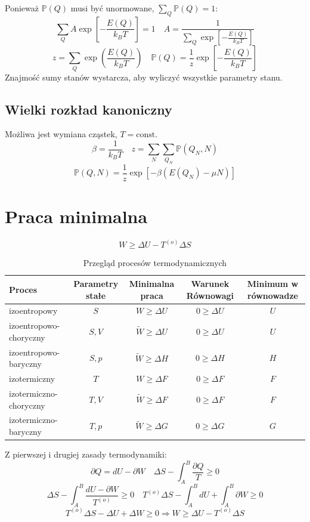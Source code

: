\documentclass{../notatki}
\begin{document}
Ponieważ $\mathbb{P}(Q)$ musi być unormowane, $\sum_{Q} \mathbb{P}(Q) = 1$:
$$
\sum_Q A\exp\left[-\frac{E(Q)}{k_BT}\right] = 1 \quad A =
\frac{1}{\sum_Q \exp\left[-\frac{E(Q)}{k_BT}\right]}
$$
$$
z = \sum_Q \exp \left(\frac{E(Q)}{k_BT}\right) \quad \mathbb{P}(Q) =
\frac{1}{z} \exp \left[-\frac{E(Q)}{k_BT}\right]
$$
Znajmość sumy stanów wystarcza, aby wyliczyć wszystkie parametry stanu.

\subsection{Wielki rozkład kanoniczny}

Możliwa jest wymiana cząstek, $T = \textrm{const}$.
$$
\beta = \frac{1}{k_BT} \quad z = \sum_N \sum_{Q_N} \mathbb{P}(Q_N, N)
$$
$$
\mathbb{P}(Q, N) = \frac{1}{z} \exp \left[-\beta(E(Q_N) - \mu N)\right]
$$

\section{Praca minimalna}

$$
W \geq \Delta U - T^{(o)} \Delta S
$$

\begin{table}[h]
  \centering
  \begin{tabular}{l|c|c|c|c}
    \textbf{Proces} & Parametry stałe & Minimalna praca & Warunek
    Równowagi & Minimum w równowadze \\
    \hline
    izoentropowy & $S$ & $W \geq \Delta U$ & $0 \geq \Delta U$ & $U$ \\ \hline
    izoentropowo-choryczny & $S, V$ & $\tilde{W} \geq \Delta U$ & $0
    \geq \Delta U$ & $U$ \\ \hline
    izoentropowo-baryczny & $S, p$ & $\tilde{W} \geq \Delta H$ & $0
    \geq \Delta H$ & $H$ \\ \hline
    izotermiczny & $T$ & $W \geq \Delta F$ & $0 \geq \Delta F$ & $F$ \\ \hline
    izotermiczno-choryczny & $T, V$ & $\tilde{W} \geq \Delta F$ & $0
    \geq \Delta F$ & $F$ \\ \hline
    izotermiczno-baryczny & $T, p$ & $\tilde{W} \geq \Delta G$ & $0
    \geq \Delta G$ & $G$
  \end{tabular}
  \caption{Przegląd procesów termodynamicznych}
\end{table}

\begin{examplebox}
  Z pierwszej i drugiej zasady termodynamiki:
  $$
  \partial Q = dU - \partial W \quad \Delta S - \int_A^B
  \frac{\partial Q}{T} \geq 0
  $$
  $$
  \Delta S - \int_A^B \frac{dU - \partial W}{T^{(o)}} \geq 0 \quad
  T^{(o)} \Delta S - \int_A^B dU + \int_A^B \partial W \geq 0
  $$
  $$
  T^{(o)} \Delta S - \Delta U + \Delta W \geq 0 \Rightarrow W \geq
  \Delta U - T^{(o)} \Delta S
  $$
\end{examplebox}
\end{document}
